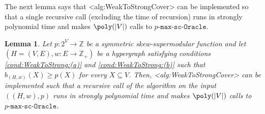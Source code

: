 \documentclass{article}
\def\Cref#1{<#1>}%
\newtheorem{lemma}{Lemma}[section]
\newcommand{\functionMaximizationOracleStrongCover}[1]{\ensuremath{{#1}\text{-}\mathtt{max}\text{-}\mathtt{sc}\text{-}\mathtt{Oracle}}\xspace}
\newcommand{\maximalTightSetContainingHyperedge}[1]{\ensuremath{\tau_{#1}}\xspace}
\providecommand{\Z}{\mathbb{Z}}
\begin{document}
The next lemma says that \Cref{alg:WeakToStrongCover} can be implemented so that a single recursive call (excluding the time of recursion) runs in strongly polynomial time and makes $\poly(|V|)$ calls to \functionMaximizationOracleStrongCover{p}.
  \begin{lemma}\label{lem:WeakToStrongCover:single-recursive-call-strongly-polytime}
      Let $p:2^V\rightarrow\Z$ be a symmetric skew-supermodular function and let $\left(H = (V, E), w:E \rightarrow\Z_+\right)$ be a hypergraph satisfying conditions \ref{cond:WeakToStrong:(a)} and \ref{cond:WeakToStrong:(b)} such that $b_{(H,w)}(X) \geq p(X)$ for every $X \subseteq V$. Then, 
 \Cref{alg:WeakToStrongCover} can be implemented such that a recursive call of the algorithm on the input $((H,w), p)$ runs in strongly polynomial time and makes $\poly(|V|)$ calls to \functionMaximizationOracleStrongCover{p}.
  \end{lemma}  
\end{document}
